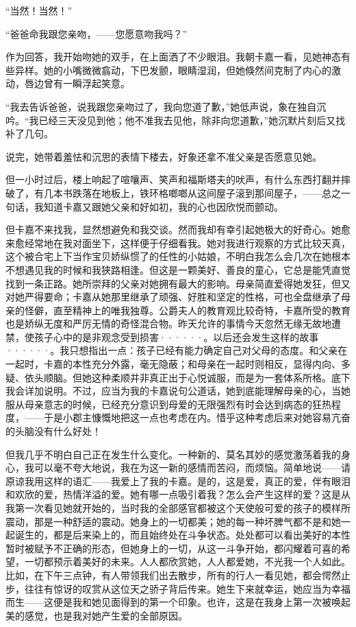\documentclass[12pt, UTF8]{ctexbook}
\begin{document}
\par “当然！当然！”
\par “爸爸命我跟您亲吻，——您愿意吻我吗？”
\par 作为回答，我开始吻她的双手，在上面洒了不少眼泪。我朝卡嘉一看，见她神态有些异样。她的小嘴微微翕动，下巴发颤，眼睛湿润，但她倏然间克制了内心的激动，唇边曾有一瞬浮起笑意。
\par “我去告诉爸爸，说我跟您亲吻过了，我向您道了歉，”她低声说，象在独自沉吟。“我已经三天没见到他；他不准我去见他，除非向您道歉，”她沉默片刻后又找补了几句。
\par 说完，她带着羞怯和沉思的表情下楼去，好象还拿不准父亲是否愿意见她。
\par 但一小时过后，楼上响起了喧嚷声、笑声和福斯塔夫的吠声，有什么东西打翻并摔破了，有几本书跌落在地板上，铁环格啷啷从这间屋子滚到那间屋子，——总之一句话，我知道卡嘉又跟她父亲和好如初，我的心也因欣悦而颤动。
\par 但卡嘉不来找我，显然想避免和我交谈。然而我却有幸引起她极大的好奇心。她愈来愈经常地在我对面坐下，这样便于仔细看我。她对我进行观察的方式比较天真，这个被合宅上下当作宝贝娇纵惯了的任性的小姑娘，不明白我怎么会几次在她根本不想遇见我的时候和我狭路相逢。但这是一颗美好、善良的童心，它总是能凭直觉找到一条正路。她所崇拜的父亲对她拥有最大的影响。母亲简直爱得她发狂，但又对她严得要命；卡嘉从她那里继承了顽强、好胜和坚定的性格，可也全盘继承了母亲的怪僻，直至精神上的唯我独尊。公爵夫人的教育观比较奇特，卡嘉所受的教育也是娇纵无度和严厉无情的奇怪混合物。昨天允许的事情今天忽然无缘无故地遭禁，使孩子心中的是非观念受到损害······。以后还会发生这样的故事······。我只想指出一点：孩子已经有能力确定自己对父母的态度。和父亲在一起时，卡嘉的本性充分外露，毫无隐蔽；和母亲在一起时则相反，显得内向、多疑、依头顺脑。但她这种柔顺并非真正出于心悦诚服，而是为一套体系所格。底下我会详加说明。不过，应当为我的卡嘉说句公道话，她到底能理解母亲的心，当她服从母亲意志的时候，已经充分意识到母爱的无限强烈有时会达到病态的狂热程度，——于是小郡主慷慨地把这一点也考虑在内。惜乎这种考虑后来对她容易亢奋的头脑没有什么好处！
\par 但我几乎不明白自己正在发生什么变化。一种新的、莫名其妙的感觉激荡着我的身心，我可以毫不夸大地说，我在为这一新的感情而苦闷，而烦恼。简单地说——请原谅我用这样的语汇——我爱上了我的卡嘉。是的，这是爱，真正的爱，伴有眼泪和欢欣的爱，热情洋溢的爱。她有哪一点吸引着我？怎么会产生这样的爱？这是从我第一次看见她就开始的，当时我的全部感官都被这个天使般可爱的孩子的模样所震动，那是一种舒适的震动。她身上的一切都美；她的每一种坏脾气都不是和她一起诞生的，都是后来染上的，而且始终处在斗争状态。处处都可以看出美好的本性暂时被赋予不正确的形态，但她身上的一切，从这一斗争开始，都闪耀着可喜的希望，一切都预示着美好的未来。人人都欣赏她，人人都爱她，不光我一个人如此。比如，在下午三点钟，有人带领我们出去散步，所有的行人一看见她，都会愕然止步，往往有惊讶的叹赏从这位天之骄子背后传来。她生下来就幸运，她应当为幸福而生——这便是我和她见面得到的第一个印象。也许，这是在我身上第一次被唤起美的感觉，也是我对她产生爱的全部原因。
\end{document}

